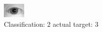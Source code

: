 \begin{figure}[h!]
\begin{center}
\includegraphics[width=0.60\columnwidth]{figures/ID1183_class_2_target_3.png}
\end{center}
\caption{ Classification: 2 actual target: 3}
\label{fig:ID1183_class_2_target_3}
\end{figure}
